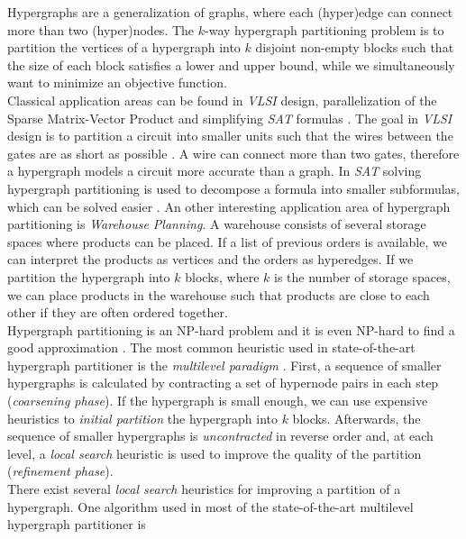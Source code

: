 Hypergraphs are a generalization of graphs, where each (hyper)edge can connect 
more than two (hyper)nodes. The $k$-way hypergraph partitioning problem is to 
partition the vertices of a hypergraph into $k$ disjoint non-empty blocks such
that the size of each block satisfies a lower and upper bound, while we simultaneously 
want to minimize an objective function. \\
Classical application areas can be found in \emph{VLSI} design, parallelization of
the Sparse Matrix-Vector Product and simplifying \emph{SAT} formulas 
\cite{karypis1999multilevel, mann2014formula, papa2007hypergraph}. The goal 
in \emph{VLSI} design is to partition a circuit into smaller units such that
the wires between the gates are as short as possible \cite{bulucc2016recent}.
A wire can connect more than two gates, therefore a hypergraph models a circuit more
accurate than a graph. In \emph{SAT} solving hypergraph partitioning is used to
decompose a formula into smaller subformulas, which can be solved easier \cite{mann2014formula}.
An other interesting application area of hypergraph partitioning is \emph{Warehouse Planning}. 
A warehouse consists of several storage spaces where products can be placed. 
If a list of previous orders is available, we can interpret the products as 
vertices and the orders as hyperedges. If we partition the hypergraph 
into $k$ blocks, where $k$ is the number of storage spaces,
we can place products in the warehouse such that products are close to each other if
they are often ordered together.\\
Hypergraph partitioning is an NP-hard problem \cite{lengauer2012combinatorial} and
it is even NP-hard to find a good approximation \cite{bui1992finding}.
The most common heuristic used in state-of-the-art hypergraph partitioner is the
\emph{multilevel paradigm} \cite{catalyurek1999hypergraph, heuer2017improving, karypis1999multilevel}.
First, a sequence of smaller hypergraphs is calculated by contracting a set of hypernode pairs
in each step (\emph{coarsening phase}). If the hypergraph is small enough, we can use expensive
heuristics to \emph{initial partition} the hypergraph into $k$ blocks. Afterwards, the sequence
of smaller hypergraphs is \emph{uncontracted} in reverse order and, at each level, a 
\emph{local search} heuristic is used to improve the quality of the partition 
(\emph{refinement phase}). \\
There exist several \emph{local search} heuristics for improving a partition of a hypergraph.
One algorithm used in most of the state-of-the-art multilevel hypergraph partitioner is

